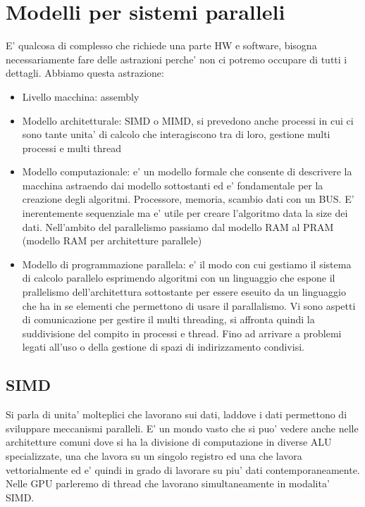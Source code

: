 \section{Modelli per sistemi paralleli}

E' qualcosa di complesso che richiede una parte HW e software, bisogna necessariamente fare delle astrazioni perche' non ci potremo occupare di tutti i dettagli.
Abbiamo questa astrazione:
\begin{itemize}
    \item Livello macchina: assembly
    \item Modello architetturale: SIMD o MIMD, si prevedono anche processi in cui ci sono tante unita' di calcolo che interagiscono tra di loro, gestione multi processi e multi thread
    \item Modello computazionale: e' un modello formale che consente di descrivere la macchina astraendo dai modello sottostanti ed e' fondamentale per la creazione degli algoritmi. Processore, memoria, scambio dati con un BUS. E' inerentemente sequenziale ma e' utile per creare l'algoritmo data la size dei dati. Nell'ambito del parallelismo passiamo dal modello RAM al PRAM (modello RAM per architetture parallele)
    \item Modello di programmazione parallela: e' il modo con cui gestiamo il sistema di calcolo parallelo esprimendo algoritmi con un linguaggio che espone il prallelismo dell'architettura sottostante per essere eseuito da un linguaggio che ha in se elementi che permettono di usare il parallalismo. Vi sono aspetti di comunicazione per gestire il multi threading, si affronta quindi la suddivisione del compito in processi e thread. Fino ad arrivare a problemi legati all'uso o della gestione di spazi di indirizzamento condivisi.
\end{itemize}

\subsection{SIMD}
Si parla di unita' molteplici che lavorano sui dati, laddove i dati permettono di sviluppare meccanismi paralleli. E' un mondo vasto che si puo' vedere anche nelle architetture comuni dove si ha la divisione di computazione in diverse ALU specializzate, una che lavora su un singolo registro ed una che lavora vettorialmente ed e' quindi in grado di lavorare su piu' dati contemporaneamente. Nelle GPU parleremo di thread che lavorano simultaneamente in modalita' SIMD.

